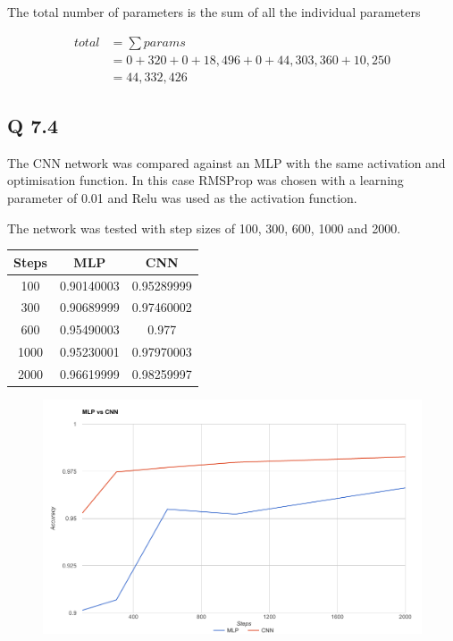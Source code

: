 The total number of parameters is the sum of all the individual parameters

\begin{align*}
	total &= \sum params\\
	&= 0 + 320 + 0 + 18,496 + 0 + 44,303,360 + 10,250\\
	&= 44,332,426
\end{align*}

\subsection*{Q 7.4}


The CNN network was compared against an MLP with the same activation and optimisation function.
In this case RMSProp was chosen with a learning parameter of 0.01 and Relu was used as the activation function.

The network was tested with step sizes of 100, 300, 600, 1000 and 2000.

\begin{table}
\centering
\begin{tabular}{|c|c|c|}
\hline
Steps & MLP & CNN \\
\hline
100 & 0.90140003 & 0.95289999 \\
300 & 0.90689999 & 0.97460002 \\
600 & 0.95490003 & 0.977 \\
1000 & 0.95230001 & 0.97970003 \\
2000 & 0.96619999 & 0.98259997 \\
\hline
\end{tabular}
\end{table}

\begin{figure}[H]
	\centering
	\includegraphics[width=\linewidth]{images/q7_cnn_vs_mlp}
\end{figure}

